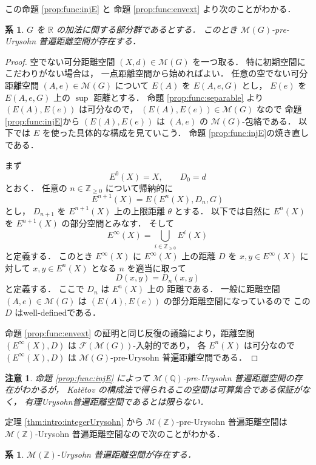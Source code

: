\documentclass[leqno, 12pt]{jsarticle}
\newtheorem{cor}[thm]{系}
\newtheorem*{rmk}{注意}
\newcommand{\zz}{\mathbb{Z}}
\newcommand{\yozz}[1]{\zz_{\ge #1}}
\renewcommand{\qq}{\mathbb{Q}}
\newcommand{\rr}{\mathbb{R}}
\newcommand{\Met}[1]{\mathscr{M}(#1)}
\newcommand{\FinitePart}[1]{\mathscr{F}(#1)}
\newcommand{\FinMet}[1]{\FinitePart{\Met{#1}}}
\newcommand{\Espace}[3]{E(#1,#2,#3)}
\newcommand{\KatDist}{\theta}
\newcommand{\Estage}[2]{E^{#1}(#2)}
\begin{document}
この命題
 \ref{prop:func:injE}
 と
 命題 \ref{prop:func:envext}
 より次のことがわかる．
\begin{cor}\label{cor:func:extG}
$G$
を
$\rr$
の加法に関する部分群であるとする．
このとき
$\Met{G}$-pre-Urysohn
普遍距離空間が存在する．
\end{cor}
\begin{proof}
空でない可分距離空間
$(X, d)\in \Met{G}$
を一つ取る．
特に初期空間にこだわりがない場合は，
一点距離空間から始めればよい．
任意の空でない可分距離空間
$(A,e)\in\Met{G}$
について
$E(A)$
を
$\Espace{A}{e}{G}$
とし，
 $E(e)$
 を
 $\Espace{A}{e}{G}$
 上の
 $\sup$
 距離とする．
命題
\ref{prop:func:separable}
より
$(E(A), E(e))$
は可分なので，
$(E(A), E(e))\in \Met{G}$
なので
命題
\ref{prop:func:injE}から
$(E(A),E(e))$
は
$(A,e)$
の
$\Met{G}$-包絡である．
以下では
$E$
を使った具体的な構成を見ていこう．
命題
\ref{prop:func:injE}の焼き直しである．




まず
\[
\Estage{0}{X}=X,
\qquad
D_{0}=d
\]
とおく．
任意の
$n\in\yozz{0}$
について帰納的に
\[
\Estage{n+1}{X}=\Espace{\Estage{n}{X}}{D_n}{G}
\]
とし，
$D_{n+1}$
を
$\Estage{n+1}{X}$
上の上限距離
$\KatDist$
とする．%
以下では自然に
$\Estage{n}{X}$
を
$\Estage{n+1}{X}$
の部分空間とみなす．
そして
\[
\Estage{\infty}{X}=\bigcup_{i\in \yozz{0}}\Estage{i}{X}
\]
と定義する．
このとき
$\Estage{\infty}{X}$
に
$\Estage{\infty}{X}$
上の距離
$D$
を
$x, y\in \Estage{\infty}{X}$
に対して
$x, y\in \Estage{n}{X}$
となる
$n$
を適当に取って
\[
D(x, y)=
D_{n}(x, y)
\]
と定義する．
ここで
$D_{n}$
は
$\Estage{n}{X}$
上の
距離である．
一般に距離空間
$(A, e)\in \Met{G}$
は
$(E(A), E(e))$
の部分距離空間になっているので
この
$D$
はwell-definedである．




命題
\ref{prop:func:envext}
の証明と同じ反復の議論により，距離空間
$(\Estage{\infty}{X}, D)$
は
$\FinMet{G}$-入射的であり，
各
$\Estage{n}{X}$
は可分なので
$(\Estage{\infty}{X}, D)$
は
$\Met{G}$-pre-Urysohn
普遍距離空間である．
\end{proof}

\begin{rmk}\label{rmk:function-envelope:rational-cardinality}
命題
\ref{prop:func:injE}
によって
$\Met{\qq}$-pre-Urysohn
普遍距離空間の存在がわかるが，
Kat\v{e}tov
の構成法で得られるこの空間は可算集合である保証がなく，
有理Urysohn普遍距離空間であるとは限らない．
\end{rmk}



定理
\ref{thm:intro:integerUrysohn}
から
$\Met{\zz}$-pre-Urysohn
普遍距離空間は
$\Met{\zz}$-Urysohn
普遍距離空間なので次のことがわかる．
\begin{cor}\label{cor:ext-z}
$\Met{\zz}$-Urysohn
普遍距離空間が存在する．
\end{cor}
\end{document}

